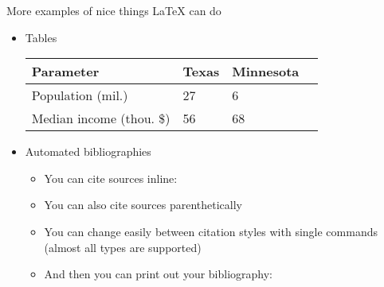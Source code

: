 \documentclass[capfont, final]{beamer}\usepackage[]{graphicx}\usepackage[]{color}
\newlength{\sepwid}
\newlength{\onecolwid}
\begin{document}
\begin{frame}[t, fragile]
\begin{columns}[T]
\begin{column}{\onecolwid}
\begin{block}{More examples of nice things \LaTeX{} can do}
\begin{itemize}
\begin{equation}
									\end{equation}
									\begin{equation}
											f(\zeta) = \int_{-\infty}^{\infty}f(x)e^{-2\pi i x \zeta} dx
									\end{equation}
							\item Tables
									\vspace{0.25em}	
									\begin{table}
									\small
									\centering
									\begin{tabular}{llll}
									\toprule
									\textbf{Parameter} & \textbf{Texas} & \textbf{Minnesota} \\
									\midrule
									Population (mil.) & 27 & 6 \\
									Median income (thou. \$) & 56 & 68\\
									\bottomrule
									\end{tabular}
									\end{table}
									\vspace{0.25em}
							\item Automated bibliographies
									\begin{itemize}
										\item You can cite sources inline: \textcite{Ashmore1991} 
										\item You can also cite sources parenthetically \autocite{Shamma2000}
										\item You can change easily between citation styles with single commands (almost all types are supported)
										\item And then you can print out your bibliography: 
									\end{itemize}
							\renewcommand*{\bibfont}{\small}
							\nocite{*}	
							\printbibliography
					\end{itemize}
				\end{block}
		\end{column} %
		\begin{column}{\sepwid}\end{column} %
	\end{columns} %
\end{frame}
\end{document}
